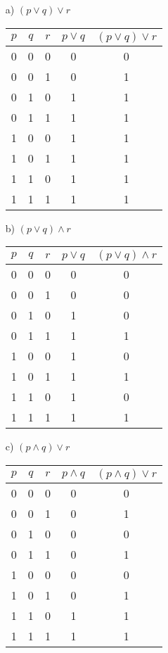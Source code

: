 \documentclass[12pt]{article}
\begin{document}
\begin{itemize}
    \item[a)] $(p \lor q) \lor r$

\begin{tabular}{|c|c|c|c|c|}
    \hline
    $p$ & $q$ & $r$ & $p \lor q$ & $(p \lor q) \lor r$ \\
    \hline
    0 & 0 & 0 & 0 & 0 \\
    0 & 0 & 1 & 0 & 1 \\
    0 & 1 & 0 & 1 & 1 \\
    0 & 1 & 1 & 1 & 1 \\
    1 & 0 & 0 & 1 & 1 \\
    1 & 0 & 1 & 1 & 1 \\
    1 & 1 & 0 & 1 & 1 \\
    1 & 1 & 1 & 1 & 1 \\
    \hline
\end{tabular}

    \item[b)] $(p \lor q) \land r$

\begin{tabular}{|c|c|c|c|c|}
    \hline
    $p$ & $q$ & $r$ & $p \lor q$ & $(p \lor q) \land r$ \\
    \hline
    0 & 0 & 0 & 0 & 0 \\
    0 & 0 & 1 & 0 & 0 \\
    0 & 1 & 0 & 1 & 0 \\
    0 & 1 & 1 & 1 & 1 \\
    1 & 0 & 0 & 1 & 0 \\
    1 & 0 & 1 & 1 & 1 \\
    1 & 1 & 0 & 1 & 0 \\
    1 & 1 & 1 & 1 & 1 \\
    \hline
\end{tabular}

    \item[c)] $(p \land q) \lor r$

\begin{tabular}{|c|c|c|c|c|}
    \hline
    $p$ & $q$ & $r$ & $p \land q$ & $(p \land q) \lor r$ \\
    \hline
    0 & 0 & 0 & 0 & 0 \\
    0 & 0 & 1 & 0 & 1 \\
    0 & 1 & 0 & 0 & 0 \\
    0 & 1 & 1 & 0 & 1 \\
    1 & 0 & 0 & 0 & 0 \\
    1 & 0 & 1 & 0 & 1 \\
    1 & 1 & 0 & 1 & 1 \\
    1 & 1 & 1 & 1 & 1 \\
    \hline
\end{tabular}


\end{itemize}
\end{document}

